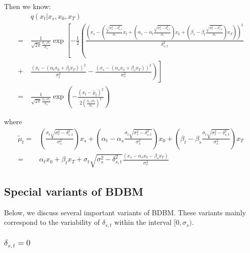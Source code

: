 \noindent Then we know: 
\begin{align}
 & q\left(x_{t}|x_{s},x_{0},x_{T}\right)\nonumber \\
=\  & \frac{1}{\sqrt{2\pi}\frac{\delta_{s,t}\sigma_{t}}{\sigma_{s}}}\exp\left[-\frac{1}{2}\left(\frac{\left(x_{s}-\left(\frac{\sqrt{\sigma_{s}^{2}-\delta_{s,t}^{2}}}{\sigma_{t}}x_{t}+\left(\alpha_{s}-\alpha_{t}\frac{\sqrt{\sigma_{s}^{2}-\delta_{s,t}^{2}}}{\sigma_{t}}\right)x_{0}+\left(\beta_{s}-\beta_{t}\frac{\sqrt{\sigma_{s}^{2}-\delta_{s,t}^{2}}}{\sigma_{t}}\right)x_{T}\right)\right)^{2}}{\delta_{s,t}^{2}}\right.\right.\nonumber \\
+ & \left.\left.\frac{\left(x_{t}-\left(\alpha_{t}x_{0}+\beta_{t}x_{T}\right)\right)^{2}}{\sigma_{t}^{2}}-\frac{\left(x_{s}-\left(\alpha_{s}x_{0}+\beta_{s}x_{T}\right)\right)^{2}}{\sigma_{s}^{2}}\right)\right]\\
=\  & \frac{1}{\sqrt{2\pi}\frac{\delta_{s,t}\sigma_{t}}{\sigma_{s}}}\exp\left(-\frac{\left(x_{t}-\tilde{\mu}_{t}\right)^{2}}{2\left(\frac{\delta_{s,t}\sigma_{t}}{\sigma_{s}}\right)^{2}}\right)
\end{align}

\noindent where
\begin{align}
\tilde{\mu}_{t}= & \left(\frac{\sigma_{t}\sqrt{\sigma_{s}^{2}-\delta_{s,t}^{2}}}{\sigma_{s}^{2}}\right)x_{s}+\left(\alpha_{t}-\alpha_{s}\frac{\sigma_{t}\sqrt{\sigma_{s}^{2}-\delta_{s,t}^{2}}}{\sigma_{s}^{2}}\right)x_{0}+\left(\beta_{t}-\beta_{s}\frac{\sigma_{t}\sqrt{\sigma_{s}^{2}-\delta_{s,t}^{2}}}{\sigma_{s}^{2}}\right)x_{T}\nonumber \\
= & \alpha_{t}x_{0}+\beta_{t}x_{T}+\sigma_{t}\sqrt{\sigma_{s}^{2}-\delta_{s,t}^{2}}\frac{\left(x_{s}-\alpha_{s}x_{0}-\beta_{s}x_{T}\right)}{\sigma_{s}^{2}}
\end{align}


\subsection{Special variants of BDBM\label{subsec:Special-cases-of-BDBM}}

Below, we discuss several important variants of BDBM. These variants
mainly correspond to the variability of $\delta_{s,t}$ within the
interval $[0,\sigma_{s})$.

\subsubsection{$\delta_{s,t}=0$}

